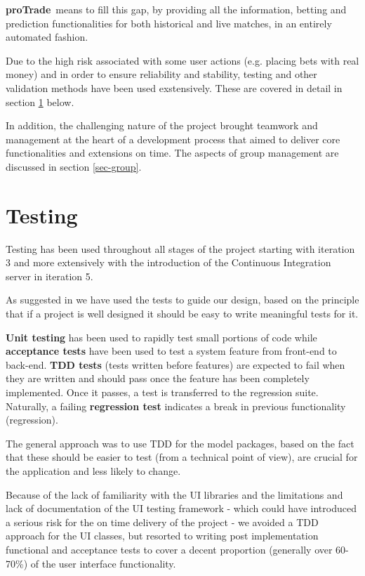 \documentclass[10pt]{article}
\newcommand{\nm}{{\bf proTrade}}
\newcommand{\nmsp}{{\nm \ }}
\begin{document}
\nmsp means to fill this gap, by providing all the information, betting and prediction functionalities for both historical and live matches, in an entirely automated fashion.

Due to the high risk associated with some user actions (e.g. placing bets with real money) and in order to ensure reliability and stability, testing and other validation methods have been used exstensively. These are covered in detail in section \ref{sec-testing} below.

In addition, the challenging nature of the project brought teamwork and management at the heart of a development process that aimed to deliver core functionalities and extensions on time. The aspects of group management are discussed in section \ref{sec-group}.

\section{Testing}
\label{sec-testing}
Testing has been used throughout all stages of the project starting with iteration 3 and more extensively with the introduction of the Continuous Integration server in iteration 5.

As suggested in \cite{bk-testing} we have used the tests to guide our design, based on the principle that if a project is well designed it should be easy to write meaningful tests for it.

\textbf{Unit testing} has been used to rapidly test small portions of code while \textbf{acceptance tests} have been used to test a system feature from front-end to back-end. \textbf {TDD tests} (tests written before features) are expected to fail when they are written and should pass once the feature has been completely implemented. Once it passes, a test is transferred to the regression suite. Naturally, a failing \textbf{regression test} indicates a break in previous functionality (regression).

The general approach was to use TDD for the model packages, based on the fact that these should be easier to test (from a technical point of view), are crucial for the application and less likely to change.

Because of the lack of familiarity with the UI libraries and the limitations and lack of documentation of the UI testing framework - which could have introduced a serious risk for the on time delivery of the project - we avoided a TDD approach for the UI classes, but resorted to writing post implementation functional and acceptance tests to cover a decent proportion (generally over 60-70\%) of the user interface functionality.
\end{document}
